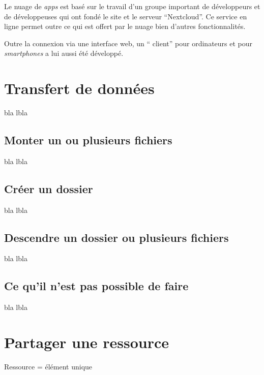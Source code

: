 Le nuage de \emph{apps} est basé sur le travail d'un groupe important de développeurs et de développeuses qui ont fondé le site et le serveur ``Nextcloud''. 
Ce service en ligne permet outre ce qui est offert par le nuage bien d'autres fonctionnalités. 

Outre la connexion via une interface web, un `` client'' pour ordinateurs et pour \emph{smartphones} a lui aussi été développé.

\section*{Transfert de données}

bla lbla

\subsection*{Monter un ou plusieurs fichiers}

bla lbla

\subsection*{Créer un dossier}

bla lbla

\subsection*{Descendre un dossier ou plusieurs fichiers}

bla lbla

\subsection*{Ce qu'il n'est pas possible de faire}

bla lbla

\section*{Partager une ressource}

Ressource = élément unique

